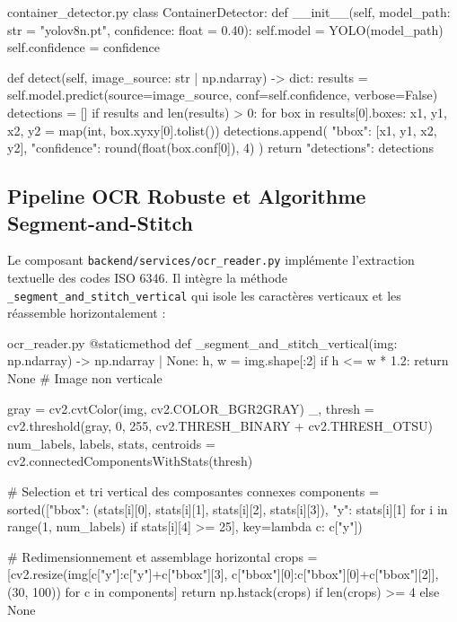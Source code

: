 \documentclass[12pt,a4paper]{article}
\begin{document}
\begin{vscodeWindow}{container\_detector.py}
class ContainerDetector:
    def __init__(self, model_path: str = "yolov8n.pt", confidence: float = 0.40):
        self.model = YOLO(model_path)
        self.confidence = confidence

    def detect(self, image_source: str | np.ndarray) -> dict:
        results = self.model.predict(source=image_source, conf=self.confidence, verbose=False)
        detections = []
        if results and len(results) > 0:
            for box in results[0].boxes:
                x1, y1, x2, y2 = map(int, box.xyxy[0].tolist())
                detections.append({
                    "bbox": [x1, y1, x2, y2],
                    "confidence": round(float(box.conf[0]), 4)
                })
        return {"detections": detections}
\end{vscodeWindow}

\subsection{Pipeline OCR Robuste et Algorithme Segment-and-Stitch}

Le composant \texttt{backend/services/ocr\_reader.py} implémente l'extraction textuelle des codes ISO 6346. Il intègre la méthode \texttt{\_segment\_and\_stitch\_vertical} qui isole les caractères verticaux et les réassemble horizontalement :

\begin{vscodeWindow}{ocr\_reader.py}
@staticmethod
def _segment_and_stitch_vertical(img: np.ndarray) -> np.ndarray | None:
    h, w = img.shape[:2]
    if h <= w * 1.2:
        return None # Image non verticale
        
    gray = cv2.cvtColor(img, cv2.COLOR_BGR2GRAY)
    _, thresh = cv2.threshold(gray, 0, 255, cv2.THRESH_BINARY + cv2.THRESH_OTSU)
    num_labels, labels, stats, centroids = cv2.connectedComponentsWithStats(thresh)
    
    # Selection et tri vertical des composantes connexes
    components = sorted([{"bbox": (stats[i][0], stats[i][1], stats[i][2], stats[i][3]), "y": stats[i][1]} 
                        for i in range(1, num_labels) if stats[i][4] >= 25], key=lambda c: c["y"])
    
    # Redimensionnement et assemblage horizontal
    crops = [cv2.resize(img[c["y"]:c["y"]+c["bbox"][3], c["bbox"][0]:c["bbox"][0]+c["bbox"][2]], (30, 100)) for c in components]
    return np.hstack(crops) if len(crops) >= 4 else None
\end{vscodeWindow}
\end{document}
